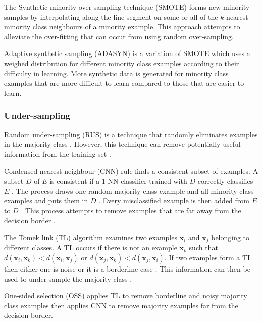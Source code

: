 \documentclass{sig-alternate-05-2015}
\begin{document}
	The Synthetic minority over-sampling technique (SMOTE) \cite{Chawla:2002:SSM:1622407.1622416} forms new minority samples by interpolating along the line segment on some or all of the $k$ nearest minority class neighbours of a minority example. This approach attempts to alleviate the over-fitting that can occur from using random over-sampling.
	
	Adaptive synthetic sampling (ADASYN) \cite{4633969} is a variation of SMOTE which uses a weighed distribution for different minority class examples according to their difficulty in learning. More synthetic data is generated for minority class examples that are more difficult to learn compared to those that are easier to learn.
	
	\subsubsection{Under-sampling}
	Random under-sampling (RUS) is a technique that randomly eliminates examples in the majority class \cite{Batista:2004:SBS:1007730.1007735}. However, this technique can remove potentially useful information from the training set \cite{Batista:2004:SBS:1007730.1007735}. 
	
	Condensed nearest neighbour (CNN) rule \cite{1056066} finds a consistent subset of examples. A subset $D$ of $E$ is consistent if a 1-NN classifier trained with $D$ correctly classifies $E$ \cite{Batista:2004:SBS:1007730.1007735}. The process draws one random majority class example and all minority class examples and puts them in $D$ \cite{Batista:2004:SBS:1007730.1007735}. Every misclassified example is then added from $E$ to $D$ \cite{Batista:2004:SBS:1007730.1007735}. This process attempts to remove examples that are far away from the decision border \cite{Batista:2004:SBS:1007730.1007735}.
	
	The Tomek link (TL) algorithm \cite{4309452} examines two examples $\textbf{x}_i$ and $\textbf{x}_j$ belonging to different classes. A TL occurs if there is not an example $\textbf{x}_k$ such that $d(\textbf{x}_i, \textbf{x}_k) < d(\textbf{x}_i, \textbf{x}_j)$ or $d(\textbf{x}_j, \textbf{x}_k) < d(\textbf{x}_j, \textbf{x}_i)$. If two examples form a TL then either one is noise or it is a borderline case \cite{Batista:2004:SBS:1007730.1007735}. This information can then be used to under-sample the majority class \cite{Batista:2004:SBS:1007730.1007735}.
	
	One-sided selection (OSS) \cite{Kubat97addressingthe} applies TL to remove borderline and noisy majority class examples then applies CNN to remove majority examples far from the decision border.
	
\end{document}
